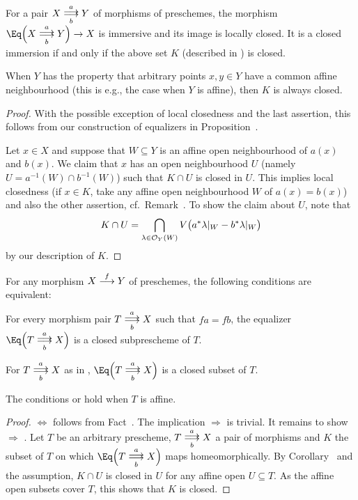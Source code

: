 \documentclass[a4paper,parskip=half,numbers=enddot, DIV=12]{scrreprt}
\begin{document}
\begin{fact}
	For a pair $X\doublemorphism[a][b]Y$ of morphisms of preschemes, the morphism $\Eq\Big(X\doublemorphism[a][b]Y\Big)\morphism X$ is immersive and its image is locally closed. It is a closed immersion if and only if the above set $K$ (described in ) is closed.
	
	When $Y$ has the property that arbitrary points $x,y\in Y$ have a common affine neighbourhood (this is e.g., the case when $Y$ is affine), then $K$ is always closed.
\end{fact}
\begin{proof}
	With the possible exception of local closedness and the last assertion, this follows from our construction of equalizers in Proposition~. 
	
	Let $x\in X$ and suppose that $W\subseteq Y$ is an affine open neighbourhood of $a(x)$ and $b(x)$. We claim that $x$ has an open neighbourhood $U$ (namely $U=a^{-1}(W)\cap b^{-1}(W)$) such that $K\cap U$ is closed in $U$. This implies local closedness (if $x\in K$, take any affine open neighbourhood $W$ of $a(x)=b(x)$) and also the other assertion, cf.\ Remark~. To show the claim about $U$, note that
	\begin{align*}
		K\cap U=\bigcap_{\lambda\in\mathcal{O}_Y(W)}V\big(a^*\lambda|_W-b^*\lambda|_W\big)
	\end{align*}
	by our description of $K$.
\end{proof}
\begin{fact}
	For any morphism $X\morphism[f]Y$ of preschemes, the following conditions are equivalent:
	\begin{alphanumerate}
		\item For every morphism pair $T\doublemorphism[a][b] X$ such that $fa=fb$, the equalizer $\Eq\Big(T\doublemorphism[a][b]X\Big)$ is a closed subprescheme of $T$.
		\item For $T\doublemorphism[a][b] X$ as in , $\Eq\Big(T\doublemorphism[a][b]X\Big)$ is a closed subset of $T$.
		\item The conditions  or  hold when $T$ is affine.
	\end{alphanumerate}
\end{fact}
\begin{proof}
	 $\Leftrightarrow$  follows from Fact~. The implication  $\Rightarrow$  is trivial. It remains to show  $\Rightarrow$ . Let $T$ be an arbitrary prescheme, $T\doublemorphism[a][b]X$ a pair of morphisms and $K$ the subset of $T$ on which $\smash{\Eq\Big(}T\doublemorphism[\smash{a}][b]X\smash{\Big)}$ maps homeomorphically. By Corollary~ and the assumption, $K\cap U$ is closed in $U$ for any affine open $U\subseteq T$. As the affine open subsets cover $T$, this shows that $K$ is closed.
\end{proof}
\end{document}
